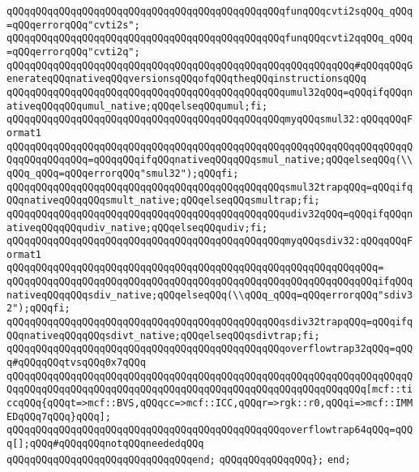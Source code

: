 \newline
\verb|qQQqqQQqqQQqqQQqqQQqqQQqqQQqqQQqqQQqqQQqqQQqqQQqfunqQQqcvti2sqQQq_qQQq=qQQqerrorqQQq"cvti2s";|\newline
\verb|qQQqqQQqqQQqqQQqqQQqqQQqqQQqqQQqqQQqqQQqqQQqqQQqfunqQQqcvti2qqQQq_qQQq=qQQqerrorqQQq"cvti2q";|\newline
\newline
\verb|qQQqqQQqqQQqqQQqqQQqqQQqqQQqqQQqqQQqqQQqqQQqqQQqqQQqqQQqqQQq#qQQqqQQqGenerateqQQqnativeqQQqversionsqQQqofqQQqtheqQQqinstructionsqQQq|\newline
\verb|qQQqqQQqqQQqqQQqqQQqqQQqqQQqqQQqqQQqqQQqqQQqqQQqumul32qQQq=qQQqifqQQqnativeqQQqqQQqumul_native;qQQqelseqQQqumul;fi;|\newline
\newline
\verb|qQQqqQQqqQQqqQQqqQQqqQQqqQQqqQQqqQQqqQQqqQQqqQQqmyqQQqsmul32:qQQqqQQqFormat1|\newline
\verb|qQQqqQQqqQQqqQQqqQQqqQQqqQQqqQQqqQQqqQQqqQQqqQQqqQQqqQQqqQQqqQQqqQQqqQQqqQQqqQQqqQQq=qQQqqQQqifqQQqnativeqQQqqQQqsmul_native;qQQqelseqQQq(\\qQQq_qQQq=qQQqerrorqQQq"smul32");qQQqfi;|\newline
\newline
\verb|qQQqqQQqqQQqqQQqqQQqqQQqqQQqqQQqqQQqqQQqqQQqqQQqsmul32trapqQQq=qQQqifqQQqnativeqQQqqQQqsmult_native;qQQqelseqQQqsmultrap;fi;|\newline
\verb|qQQqqQQqqQQqqQQqqQQqqQQqqQQqqQQqqQQqqQQqqQQqqQQqudiv32qQQq=qQQqifqQQqnativeqQQqqQQqudiv_native;qQQqelseqQQqudiv;fi;|\newline
\newline
\verb|qQQqqQQqqQQqqQQqqQQqqQQqqQQqqQQqqQQqqQQqqQQqqQQqmyqQQqsdiv32:qQQqqQQqFormat1|\newline
\verb|qQQqqQQqqQQqqQQqqQQqqQQqqQQqqQQqqQQqqQQqqQQqqQQqqQQqqQQqqQQqqQQq=|\newline
\verb|qQQqqQQqqQQqqQQqqQQqqQQqqQQqqQQqqQQqqQQqqQQqqQQqqQQqqQQqqQQqqQQqifqQQqnativeqQQqqQQqsdiv_native;qQQqelseqQQq(\\qQQq_qQQq=qQQqerrorqQQq"sdiv32");qQQqfi;|\newline
\newline
\verb|qQQqqQQqqQQqqQQqqQQqqQQqqQQqqQQqqQQqqQQqqQQqqQQqsdiv32trapqQQq=qQQqifqQQqnativeqQQqqQQqsdivt_native;qQQqelseqQQqsdivtrap;fi;|\newline
\newline
\verb|qQQqqQQqqQQqqQQqqQQqqQQqqQQqqQQqqQQqqQQqqQQqqQQqoverflowtrap32qQQq=qQQq#qQQqqQQqtvsqQQq0x7qQQq|\newline
\verb|qQQqqQQqqQQqqQQqqQQqqQQqqQQqqQQqqQQqqQQqqQQqqQQqqQQqqQQqqQQqqQQqqQQqqQQqqQQqqQQqqQQqqQQqqQQqqQQqqQQqqQQqqQQqqQQqqQQqqQQqqQQqqQQqqQQq[mcf::ticcqQQq{qQQqt=>mcf::BVS,qQQqcc=>mcf::ICC,qQQqr=>rgk::r0,qQQqi=>mcf::IMMEDqQQq7qQQq}qQQq];|\newline
\verb|qQQqqQQqqQQqqQQqqQQqqQQqqQQqqQQqqQQqqQQqqQQqqQQqoverflowtrap64qQQq=qQQq[];qQQq#qQQqqQQqnotqQQqneededqQQq|\newline
\verb|qQQqqQQqqQQqqQQqqQQqqQQqqQQqqQQqend;|\newline
\verb|qQQqqQQqqQQqqQQq};|\newline
\verb|end;|\newline

